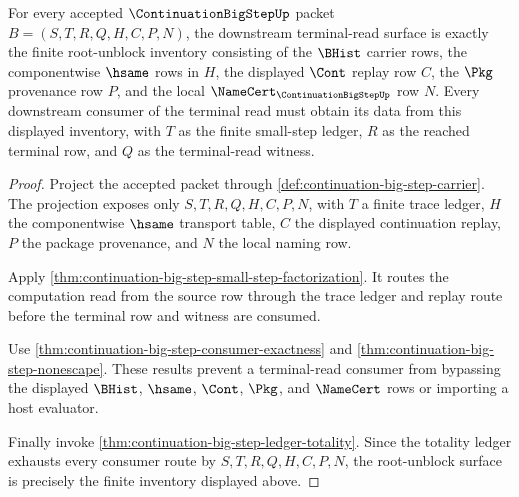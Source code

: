 \begin{theorem}
\label{thm:continuation-bigstep-root-unblock-finite-surface}
For every accepted $\ContinuationBigStepUp$ packet $B=(S,T,R,Q,H,C,P,N)$, the downstream terminal-read surface is exactly the finite root-unblock inventory consisting of the $\BHist$ carrier rows, the componentwise $\hsame$ rows in $H$, the displayed $\Cont$ replay row $C$, the $\Pkg$ provenance row $P$, and the local $\NameCert_{\ContinuationBigStepUp}$ row $N$. Every downstream consumer of the terminal read must obtain its data from this displayed inventory, with $T$ as the finite small-step ledger, $R$ as the reached terminal row, and $Q$ as the terminal-read witness.
\end{theorem}
\begin{proof}
Project the accepted packet through \autoref{def:continuation-big-step-carrier}. The projection exposes only $S,T,R,Q,H,C,P,N$, with $T$ a finite trace ledger, $H$ the componentwise $\hsame$ transport table, $C$ the displayed continuation replay, $P$ the package provenance, and $N$ the local naming row.

Apply \autoref{thm:continuation-big-step-small-step-factorization}. It routes the computation read from the source row through the trace ledger and replay route before the terminal row and witness are consumed.

Use \autoref{thm:continuation-big-step-consumer-exactness} and \autoref{thm:continuation-big-step-nonescape}. These results prevent a terminal-read consumer from bypassing the displayed $\BHist$, $\hsame$, $\Cont$, $\Pkg$, and $\NameCert$ rows or importing a host evaluator.

Finally invoke \autoref{thm:continuation-big-step-ledger-totality}. Since the totality ledger exhausts every consumer route by $S,T,R,Q,H,C,P,N$, the root-unblock surface is precisely the finite inventory displayed above.
\end{proof}

